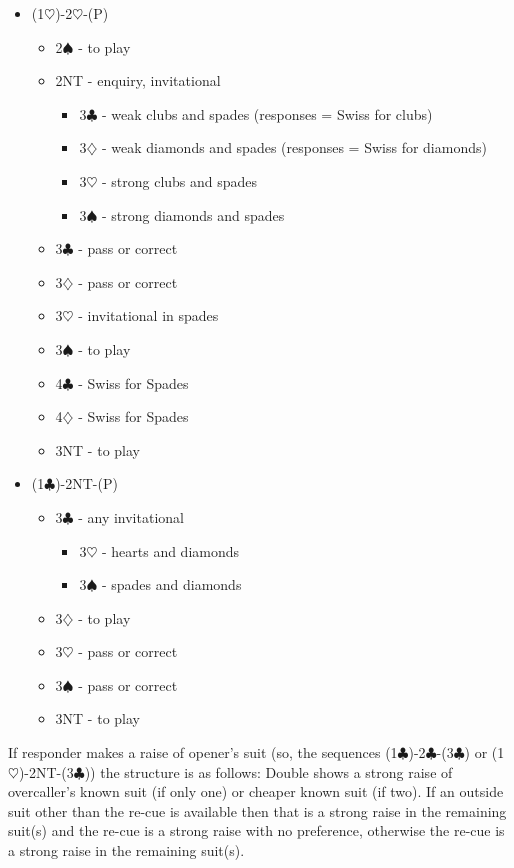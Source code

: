 \documentclass[a4paper,14pt]{extarticle}
\begin{document}
\begin{itemize}
\item (1$\heartsuit$)-2$\heartsuit$-(P)
	\begin{itemize}
	\item 2$\spadesuit$ - to play
	\item 2NT - enquiry, invitational
		\begin{itemize}
		\item 3$\clubsuit$ - weak clubs and spades (responses = Swiss for clubs)
		\item 3$\diamondsuit$ - weak diamonds and spades (responses = Swiss for diamonds)
		\item 3$\heartsuit$ - strong clubs and spades
		\item 3$\spadesuit$ - strong diamonds and spades
		\end{itemize}
	\item 3$\clubsuit$ - pass or correct
	\item 3$\diamondsuit$ - pass or correct
	\item 3$\heartsuit$ - invitational in spades
	\item 3$\spadesuit$ - to play
	\item 4$\clubsuit$ - Swiss for Spades
	\item 4$\diamondsuit$ - Swiss for Spades
	\item 3NT - to play
	\end{itemize}
\item (1$\clubsuit$)-2NT-(P)
	\begin{itemize}
	\item 3$\clubsuit$ - any invitational
		\begin{itemize}
		\item 3$\heartsuit$ - hearts and diamonds
		\item 3$\spadesuit$ - spades and diamonds
		\end{itemize}
	\item 3$\diamondsuit$ - to play
	\item 3$\heartsuit$ - pass or correct
	\item 3$\spadesuit$ - pass or correct
	\item 3NT - to play
	\end{itemize}
\end{itemize}

If responder makes a raise of opener's suit (so, the sequences (1$\clubsuit$)-2$\clubsuit$-(3$\clubsuit$)
or (1$\heartsuit$)-2NT-(3$\clubsuit$)) the structure is as follows: Double shows a strong raise of
overcaller's known suit (if only one) or cheaper known suit (if two). If an outside suit other than the re-cue
is available then that is a strong raise in the remaining suit(s) and the re-cue is a strong raise with no 
preference, otherwise the re-cue is a strong raise in the remaining suit(s).
\end{document}
